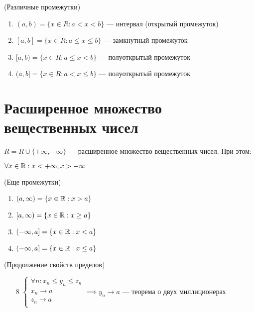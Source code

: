\begin{remark} (Различные промежутки)
    \begin{enumerate}
        \item $(a, b) = \{x \in R: a < x < b\}$ --- интервал (открытый промежуток)
        \item $[a, b] = \{x \in R: a \leq x \leq b\}$ --- замкнутный промежуток
        \item $[a, b) = \{x \in R: a \leq x < b\}$ --- полуоткрытый промежуток
        \item $(a, b] = \{x \in R: a < x \leq b\}$ --- полуоткрытый промежуток
    \end{enumerate}
\end{remark}


\section{Расширенное множество вещественных чисел}

\begin{definition}
    $\overline{R} = R \cup \{+\infty, -\infty\}$ --- расширенное множество вещественных чисел. При этом:

    $\forall x \in \mathbb{R}: x < +\infty, x > -\infty$
\end{definition}

\begin{remark} (Еще промежутки)
    \begin{enumerate}
        \item $(a, \infty) = \{x \in \mathbb{R} : x > a\}$
        \item $[a, \infty) = \{x \in \mathbb{R} : x \geq a\}$
        \item $(-\infty, a] = \{x \in \mathbb{R} : x < a\}$
        \item $(-\infty, a] = \{x \in \mathbb{R} : x \leq a\}$
    \end{enumerate}
\end{remark}


\begin{properties} (Продолжение свойств пределов)
    \begin{enumerate}
        \item[8] $\begin{cases}
            \forall n: x_n \leq y_n \leq z_n \\
            x_n \to a \\
            z_n \to a \\
        \end{cases} \implies y_n \to a$ --- теорема о двух миллиционерах
    \end{enumerate}
\end{properties}

